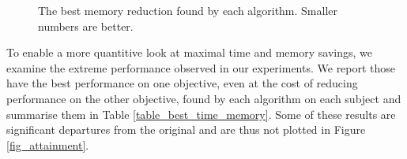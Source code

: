 \begin{figure}[htb]
	\centering
	\caption{The best memory reduction found by each algorithm. Smaller numbers are better.}\label{fig_best_memory}
\end{figure}

To enable a more quantitive look at maximal time and memory savings, we
examine the extreme performance observed in our experiments. We report
those have the best performance on
one objective, even at the cost of reducing performance on the other
objective, found by each
algorithm on each subject and summarise them in Table
\ref{table_best_time_memory}. Some of these results are significant
departures from the original and are thus not plotted in Figure
\ref{fig_attainment}. 


